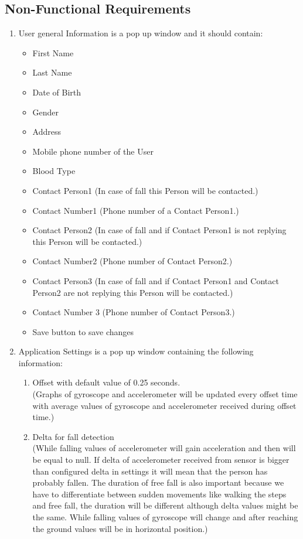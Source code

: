 \documentclass[conference,12pt]{IEEETran}
\begin{document}
\subsection{Non-Functional Requirements}
\begin{enumerate}
	\item User general Information is a pop up window and it should contain:
	\begin{itemize}
		\item First Name
		\item Last Name
		\item Date of Birth
		\item Gender
		\item Address
		\item Mobile phone number of the User
		\item Blood Type
		\item Contact Person1 (In case of fall this Person will be contacted.)
		\item Contact Number1 (Phone number of a Contact Person1.)
		\item Contact Person2 (In case of fall and if Contact Person1 is not replying this Person will be contacted.)
		\item Contact Number2 (Phone number of Contact Person2.)
		\item Contact Person3\* (In case of fall and if Contact Person1 and Contact Person2 are not replying this Person will be contacted.)
		\item  Contact Number 3\* (Phone number of Contact Person3.)
		\item Save button to save changes
	\end{itemize}
	\item Application Settings is a pop up window containing the following information:
	\begin{enumerate}
		\item Offset with default value of 0.25 seconds.
		\\(Graphs of gyroscope and accelerometer will be updated every offset time with average values of gyroscope and accelerometer received during offset time.)
		\item Delta for fall detection
		\\(While falling values of accelerometer will gain acceleration and then will be equal to null. If delta of accelerometer received from sensor is bigger than configured delta in settings it will mean that the person has probably fallen. The duration of free fall is also important because we have to differentiate between	sudden movements like walking the steps and free fall, the duration will be different although delta values might be the same. While falling values of gyroscope will change and after reaching the 			ground values will be in horizontal position.)

\end{enumerate}
\end{enumerate}
\end{document}
